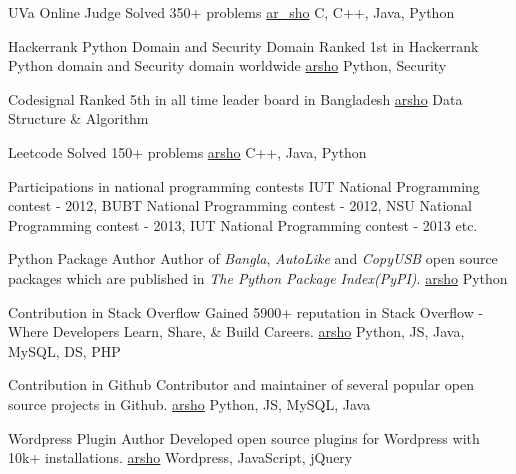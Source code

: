 \documentclass[10pt,a4paper]{altacv}
\begin{document}
\medskip

\medskip

\cvprogramming
{UVa Online Judge}
{Solved 350+ problems}
{\href{https://uhunt.onlinejudge.org/id/141799}{ar\_sho}}
{C, C++, Java, Python}
\divider

\cvprogramming
{Hackerrank Python Domain and Security Domain}
{Ranked 1st in Hackerrank Python domain and Security domain worldwide}
{\href{https://www.hackerrank.com/leaderboard?filter=arsho&filter_on=hacker&page=1&track=python&type=practice}{arsho}}
{Python, Security}
\divider

\cvprogramming
{Codesignal}
{Ranked 5th in all time leader board in Bangladesh}
{\href{https://app.codesignal.com/leaderboard/?type=individual&period=total&country=BD}{arsho}}
{Data Structure \& Algorithm}
\divider

\cvprogramming
{Leetcode}
{Solved 150+ problems}
{\href{https://leetcode.com/arsho/}{arsho}}
{C++, Java, Python}
\divider

\cvonsitecontest
{Participations in national programming contests}
{IUT National Programming
contest - 2012, BUBT National Programming
contest - 2012, NSU National Programming
contest - 2013, IUT National Programming
contest - 2013 etc.}

\medskip

\cvprogramming
{Python Package Author}
{Author of \textit{Bangla}, \textit{AutoLike} and \textit{CopyUSB} open source packages which are published in \textit{The Python Package Index(PyPI)}.}
{\href{https://pypi.org/user/arsho/}{arsho}}
{Python}
\divider

\cvprogramming
{Contribution in Stack Overflow}
{Gained 5900+ reputation in Stack Overflow - Where Developers Learn, Share, \& Build Careers.}
{\href{https://stackoverflow.com/users/3129414/arsho}{arsho}}
{Python, JS, Java, MySQL, DS, PHP}
\divider

\cvprogramming
{Contribution in Github}
{Contributor and maintainer of several popular open source projects in Github.}
{\href{https://github.com/arsho/}{arsho}}
{Python, JS, MySQL, Java}

\divider

\cvprogramming
{Wordpress Plugin Author}
{Developed open source plugins for Wordpress with 10k+ installations.}
{\href{https://profiles.wordpress.org/arsho/}{arsho}}
{Wordpress, JavaScript, jQuery}
\end{document}
